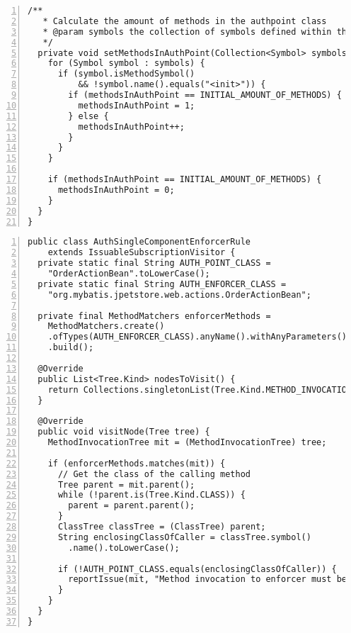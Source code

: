 \begin{lstlisting}[caption={Constraint 2. This rule ensures that at least one method in the authentication point calls the authentication enforcer.}, captionpos=b, label=lst:sq_2, numbers=left, showstringspaces=false]
  /**
   * Calculate the amount of methods in the authpoint class
   * @param symbols the collection of symbols defined within the authpoint class
   */
  private void setMethodsInAuthPoint(Collection<Symbol> symbols) {
    for (Symbol symbol : symbols) {
      if (symbol.isMethodSymbol() 
          && !symbol.name().equals("<init>")) {
        if (methodsInAuthPoint == INITIAL_AMOUNT_OF_METHODS) {
          methodsInAuthPoint = 1;
        } else {
          methodsInAuthPoint++;
        }
      }
    }

    if (methodsInAuthPoint == INITIAL_AMOUNT_OF_METHODS) {
      methodsInAuthPoint = 0;
    }
  }
}
\end{lstlisting}

\begin{lstlisting}[caption={Constraint 2. This rule ensures that calls to the authentication enforcer only occur in the authentication point.}, captionpos=b, label=lst:sq_2b, numbers=left, showstringspaces=false]
public class AuthSingleComponentEnforcerRule
    extends IssuableSubscriptionVisitor {
  private static final String AUTH_POINT_CLASS =
    "OrderActionBean".toLowerCase();
  private static final String AUTH_ENFORCER_CLASS =
    "org.mybatis.jpetstore.web.actions.OrderActionBean";

  private final MethodMatchers enforcerMethods =
    MethodMatchers.create()
    .ofTypes(AUTH_ENFORCER_CLASS).anyName().withAnyParameters()
    .build();

  @Override
  public List<Tree.Kind> nodesToVisit() {
    return Collections.singletonList(Tree.Kind.METHOD_INVOCATION);
  }

  @Override
  public void visitNode(Tree tree) {
    MethodInvocationTree mit = (MethodInvocationTree) tree;

    if (enforcerMethods.matches(mit)) {
      // Get the class of the calling method
      Tree parent = mit.parent();
      while (!parent.is(Tree.Kind.CLASS)) {
        parent = parent.parent();
      }
      ClassTree classTree = (ClassTree) parent;
      String enclosingClassOfCaller = classTree.symbol()
        .name().toLowerCase();

      if (!AUTH_POINT_CLASS.equals(enclosingClassOfCaller)) {
        reportIssue(mit, "Method invocation to enforcer must be performed at auth points");
      }
    }
  }
}

\end{lstlisting}

